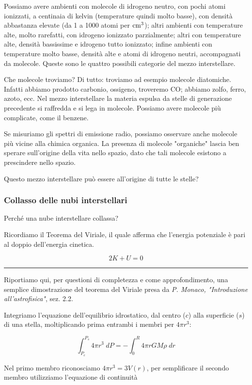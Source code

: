 Possiamo avere ambienti con molecole di idrogeno neutro, con pochi atomi ionizzati, a centinaia di kelvin (temperature quindi molto basse), con densità abbastanza elevate (da 1 a 1000 atomi per $\rm cm^3$); altri ambienti con temperature alte, molto rarefatti, con idrogeno ionizzato parzialmente; altri con temperature alte, densità bassissime e idrogeno tutto ionizzato; infine ambienti con temperature molto basse, densità alte e atomi di idrogeno neutri, accompagnati da molecole. Queste sono le quattro possibili categorie del mezzo interstellare.

Che molecole troviamo? Di tutto: troviamo ad esempio molecole diatomiche. Infatti abbiamo prodotto carbonio, ossigeno, troveremo CO; abbiamo zolfo, ferro, azoto, ecc. Nel mezzo interstellare la materia espulsa da stelle di generazione precedente si raffredda e si lega in molecole. Possiamo avere molecole più complicate, come il benzene.

Se misuriamo gli spettri di emissione radio, possiamo osservare anche molecole più vicine alla chimica organica. La presenza di molecole "organiche" lascia ben sperare sull'origine della vita nello spazio, dato che tali molecole esistono a prescindere nello spazio.

Questo mezzo interstellare può essere all'origine di tutte le stelle?

\subsubsection{Collasso delle nubi interstellari}
Perché una nube interstellare collassa?

Ricordiamo il Teorema del Viriale, il quale afferma che l'energia potenziale è pari al doppio dell'energia cinetica.

$$2K + U = 0$$

\rule[7pt]{\linewidth}{0.4pt}

Riportiamo qui, per questioni di completezza e come approfondimento, una semplice dimostrazione del teorema del Viriale presa da \textit{P. Monaco,
"Introduzione all'astrofisica"}, sez. 2.2.

\vspace{0.2cm}Integriamo l'equazione dell'equilibrio idrostatico, dal centro ($c$) alla superficie ($s$) di una stella, moltiplicando prima entrambi i membri per $4 \pi r^3$:

$$\int_{P_c}^{P_s} 4 \pi r^3 \; dP=-\int_{0}^{R} 4 \pi r G M \rho \; dr$$

Nel primo membro riconosciamo $4 \pi r^3=3V(r)$, per semplificare il secondo membro utilizziamo l'equazione di continuità

